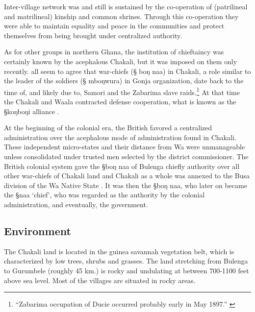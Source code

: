Inter-village network was and still is 
sustained by the co-operation of (patrilineal and matrilineal) kinship  and
common shrines.  Through this
co-operation they were able to maintain equality and peace in the communities
and  protect themselves from being brought under
centralized authority. 


As for other groups in northern Ghana, the institution of
chieftaincy was certainly known by the acephalous Chakali, but  it was imposed
on them only recently.   \cite{Wilk89, Daan94, Sali08} all seem to agree that war-chiefs  ({\S
boŋ naa})  in Chakali,  a role similar to the leader of the soldiers ({\S
mboŋwura}) in Gonja organization,  date back to the time of, and likely due to,
Samori and the
 Zabarima
slave raids.\footnote{``Zabarima occupation of Ducie occurred
probably early in May 1897.'' \cite[133]{Wilk89}} At that time the Chakali and
Waala contracted defense cooperation,
what is known as the {\S koŋboŋi} alliance \citep[63]{Daan94}. 

At the beginning of the colonial era, the British favored a  centralized
administration over the
acephalous mode of administration found in Chakali. These independent
micro-states and their distance from Wa were unmanageable unless consolidated
under  trusted men selected by the  district commissioner. The British colonial
system gave the  {\S boŋ naa} of Bulenga chiefly authority over all other
war-chiefs of Chakali land and   Chakali as a whole was  annexed  to the
Busa
division of the Wa Native State \cite[63]{Daan94}. It was then the
{\S boŋ naa},  who later on became the {\S naa} `chief',  who was regarded as
the authority by the colonial administration, and eventually,  the government. 


\subsection{Environment}
\label{sec:SOC-environ-bk}


The Chakali land is located in the guinea savannah vegetation belt, which is
characterized by low trees, shrubs and grasses.  The land stretching from
Bulenga to Gurumbele  (roughly 45 km.) is rocky and
undulating at between 700-1100 feet above sea level. Most of the
villages are situated in rocky areas. 


